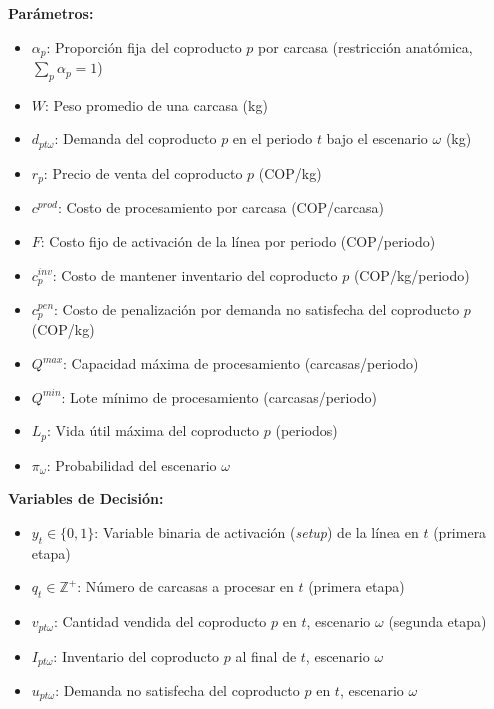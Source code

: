 \documentclass[
  spanish,
  12pt,
]{article}
\providecommand{\tightlist}{%
  \setlength{\itemsep}{0pt}\setlength{\parskip}{0pt}}
\begin{document}
\textbf{Parámetros:}

\begin{itemize}
\tightlist
\item
  \(\alpha_p\): Proporción fija del coproducto \(p\) por carcasa
  (restricción anatómica, \(\sum_p \alpha_p = 1\))
\item
  \(W\): Peso promedio de una carcasa (kg)
\item
  \(d_{pt\omega}\): Demanda del coproducto \(p\) en el periodo \(t\)
  bajo el escenario \(\omega\) (kg)
\item
  \(r_p\): Precio de venta del coproducto \(p\) (COP/kg)
\item
  \(c^{prod}\): Costo de procesamiento por carcasa (COP/carcasa)
\item
  \(F\): Costo fijo de activación de la línea por periodo (COP/periodo)
\item
  \(c^{inv}_p\): Costo de mantener inventario del coproducto \(p\)
  (COP/kg/periodo)
\item
  \(c^{pen}_p\): Costo de penalización por demanda no satisfecha del
  coproducto \(p\) (COP/kg)
\item
  \(Q^{max}\): Capacidad máxima de procesamiento (carcasas/periodo)
\item
  \(Q^{min}\): Lote mínimo de procesamiento (carcasas/periodo)
\item
  \(L_p\): Vida útil máxima del coproducto \(p\) (periodos)
\item
  \(\pi_\omega\): Probabilidad del escenario \(\omega\)
\end{itemize}

\textbf{Variables de Decisión:}

\begin{itemize}
\tightlist
\item
  \(y_t \in \{0, 1\}\): Variable binaria de activación (\emph{setup}) de
  la línea en \(t\) (primera etapa)
\item
  \(q_t \in \mathbb{Z}^+\): Número de carcasas a procesar en \(t\)
  (primera etapa)
\item
  \(v_{pt\omega}\): Cantidad vendida del coproducto \(p\) en \(t\),
  escenario \(\omega\) (segunda etapa)
\item
  \(I_{pt\omega}\): Inventario del coproducto \(p\) al final de \(t\),
  escenario \(\omega\)
\item
  \(u_{pt\omega}\): Demanda no satisfecha del coproducto \(p\) en \(t\),
  escenario \(\omega\)
\end{itemize}
\end{document}
